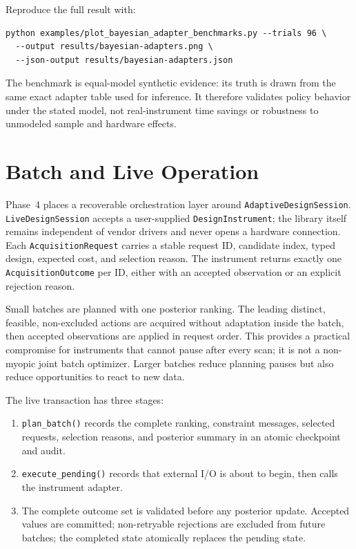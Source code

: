 \documentclass[11pt,oneside]{report}
\newcommand{\code}[1]{\texttt{#1}}
\begin{document}
Reproduce the full result with:

\begin{lstlisting}
python examples/plot_bayesian_adapter_benchmarks.py --trials 96 \
  --output results/bayesian-adapters.png \
  --json-output results/bayesian-adapters.json
\end{lstlisting}

The benchmark is equal-model synthetic evidence: its truth is drawn from the
same exact adapter table used for inference. It therefore validates policy
behavior under the stated model, not real-instrument time savings or robustness
to unmodeled sample and hardware effects.

\section{Batch and Live Operation}

Phase~4 places a recoverable orchestration layer around
\code{AdaptiveDesignSession}. \code{LiveDesignSession} accepts a user-supplied
\code{DesignInstrument}; the library itself remains independent of vendor
drivers and never opens a hardware connection. Each
\code{AcquisitionRequest} carries a stable request ID, candidate index, typed
design, expected cost, and selection reason. The instrument returns exactly one
\code{AcquisitionOutcome} per ID, either with an accepted observation or an
explicit rejection reason.

Small batches are planned with one posterior ranking. The leading distinct,
feasible, non-excluded actions are acquired without adaptation inside the
batch, then accepted observations are applied in request order. This provides a
practical compromise for instruments that cannot pause after every scan; it is
not a non-myopic joint batch optimizer. Larger batches reduce planning pauses
but also reduce opportunities to react to new data.

The live transaction has three stages:

\begin{enumerate}
  \item \code{plan\_batch()} records the complete ranking, constraint messages,
  selected requests, selection reasons, and posterior summary in an atomic
  checkpoint and audit.
  \item \code{execute\_pending()} records that external I/O is about to begin,
  then calls the instrument adapter.
  \item The complete outcome set is validated before any posterior update.
  Accepted values are committed; non-retryable rejections are excluded from
  future batches; the completed state atomically replaces the pending state.
\end{enumerate}
\end{document}
